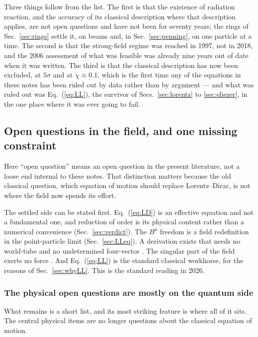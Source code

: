 \documentclass[preprint]{aastex701}
\begin{document}
\medskip

Three things follow from the list. The first is that the existence of radiation
reaction, and the accuracy of its classical description where that description
applies, are not open questions and have not been for seventy years; the rings
of Sec.~\ref{sec:rings} settle it, on beams and, in Sec.~\ref{sec:penning}, on
one particle at a time. The second is that the strong-field regime was reached
in 1997, not in 2018, and the 2006 assessment of what was feasible was already
nine years out of date when it was written. The third is that the classical
description has now been excluded, at $5\sigma$ and at $\chi\approx0.1$, which
is the first time any of the equations in these notes has been ruled out by
data rather than by argument --- and what was ruled out was
Eq.~(\ref{eq:LL}), the survivor of Secs.~\ref{sec:lorentz} to
\ref{sec:eliezer}, in the one place where it was ever going to fail.

\subsection{Open questions in the field, and one missing constraint}
\label{sec:stillopen}
Here ``open question'' means an open question in the present literature, not a
loose end internal to these notes. That distinction matters because the old
classical question, which equation of motion should replace Lorentz--Dirac, is
not where the field now spends its effort.

The settled side can be stated first. Eq.~(\ref{eq:LD}) is an effective
equation and not a fundamental one, and reduction of order is its physical
content rather than a numerical convenience (Sec.~\ref{sec:verdict}). The
$B^\mu$ freedom is a field redefinition in the point-particle limit
(Sec.~\ref{sec:LLeq}). A derivation exists that needs no world-tube and no
undetermined four-vector \citep{gralla2009}. The singular part of the field
exerts no force \citep{detweiler_whiting2003}. And Eq.~(\ref{eq:LL}) is the
standard classical workhorse, for the reasons of Sec.~\ref{sec:whyLL}. This is
the standard reading in 2026.

\subsubsection{The physical open questions are mostly on the quantum side}
\label{sec:openquantum}

What remains is a short list, and its most striking feature is where all of it
sits. The central physical items are no longer questions about the classical
equation of motion.
\end{document}
